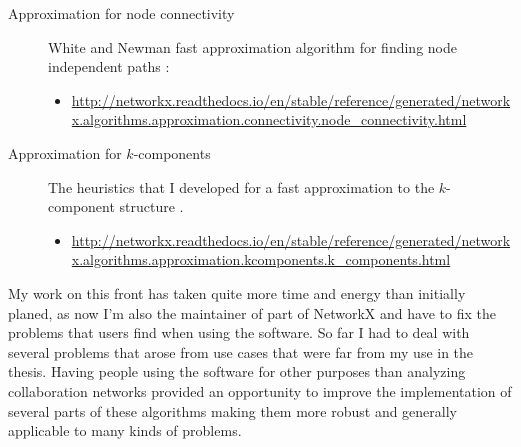 \begin{description}
\begin{tiny}
\begin{itemize}
\end{itemize}
\end{tiny}

\item[Approximation for node connectivity] White and Newman fast approximation algorithm for finding node independent paths \citep{white:2001b}:

\begin{tiny} 
\begin{itemize} 

\item \href{http://networkx.readthedocs.io/en/stable/reference/generated/networkx.algorithms.approximation.connectivity.node_connectivity.html}{http://networkx.readthedocs.io/en/stable/reference/generated/networkx.algorithms.approximation.connectivity.node\_connectivity.html}

\end{itemize}
\end{tiny}

\item[Approximation for $k$-components] The heuristics that I developed for a fast approximation to the $k$-component structure \citep{torrents:2015,torrents:2015b}.

\begin{tiny} 
\begin{itemize}

\item \href{http://networkx.readthedocs.io/en/stable/reference/generated/networkx.algorithms.approximation.kcomponents.k_components.html}{http://networkx.readthedocs.io/en/stable/reference/generated/networkx.algorithms.approximation.kcomponents.k\_components.html}

\end{itemize}
\end{tiny}

\end{description}

My work on this front has taken quite more time and energy than initially planed, as now I'm also the maintainer of part of NetworkX and have to fix the problems that users find when using the software. So far I had to deal with several problems that arose from use cases that were far from my use in the thesis. Having people using the software for other purposes than analyzing collaboration networks provided an opportunity to improve the implementation of several parts of these algorithms making them more robust and generally applicable to many kinds of problems.

